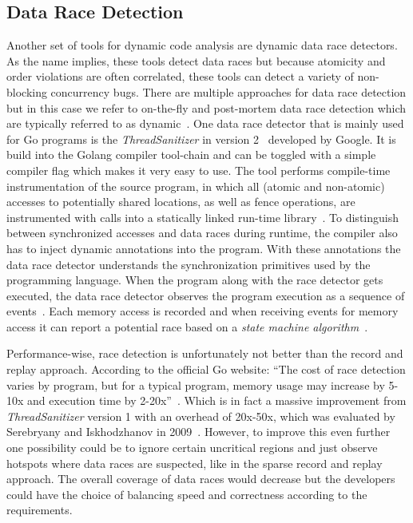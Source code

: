 \documentclass[conference]{IEEEtran}
\begin{document}
\subsection{Data Race Detection}
Another set of tools for dynamic code analysis are dynamic data race detectors.
As the name implies, these tools detect data races but because atomicity and order violations are often correlated, these tools can detect a variety of non-blocking concurrency bugs.
There are multiple approaches for data race detection but in this case we refer to on-the-fly and post-mortem data race detection which are typically referred to as dynamic~\cite{serebry2009threadsanitizer}.
One data race detector that is mainly used for Go programs is the \emph{ThreadSanitizer} in version 2~\cite{threadSanitizer} developed by Google.
It is build into the Golang compiler tool-chain and can be toggled with a simple compiler flag which makes it very easy to use.
The tool performs compile-time instrumentation of the source program, in which all (atomic and non-atomic) accesses to potentially shared locations, as well as fence operations, are instrumented with calls into a statically linked run-time library~\cite{lidbury2019sparse}.
To distinguish between synchronized accesses and data races during runtime, the compiler also has to inject dynamic annotations into the program.
With these annotations the data race detector understands the synchronization primitives used by the programming language.
When the program along with the race detector gets executed, the data race detector observes the program execution as a sequence of events~\cite{serebry2009threadsanitizer}.
Each memory access is recorded and when receiving events for memory access it can report a potential race based on a \emph{state machine algorithm}~\cite{serebry2011llvm}.

Performance-wise, race detection is unfortunately not better than the record and replay approach.
According to the official Go website: ``The cost of race detection varies by program, but for a typical program, memory usage may increase by 5-10x and execution time by 2-20x''~\cite{goRaceDetector}.
Which is in fact a massive improvement from \emph{ThreadSanitizer} version 1 with an overhead of 20x-50x, which was evaluated by Serebryany and Iskhodzhanov in 2009~\cite{serebry2009threadsanitizer}.
However, to improve this even further one possibility could be to ignore certain uncritical regions and just observe hotspots where data races are suspected, like in the sparse record and replay approach.
The overall coverage of data races would decrease but the developers could have the choice of balancing speed and correctness according to the requirements.
\end{document}
